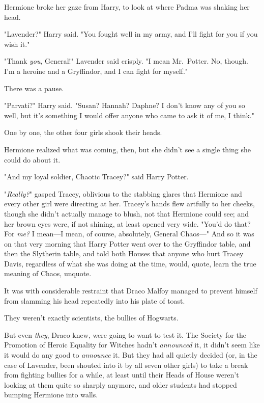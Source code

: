 Hermione broke her gaze from Harry, to look at where Padma was shaking her head.

"Lavender?" Harry said. "You fought well in my army, and I'll fight for you if
you wish it."

"Thank \emph{you}, General!" Lavender said crisply. "I mean Mr.~Potter. No,
though. I'm a heroine and a Gryffindor, and I can fight for myself."

There was a pause.

"Parvati?" Harry said. "Susan? Hannah? Daphne? I don't know any of you so well,
but it's something I would offer anyone who came to ask it of me, I think."

One by one, the other four girls shook their heads.

Hermione realized what was coming, then, but she didn't see a single thing she
could do about it.

"And my loyal soldier, Chaotic Tracey?" said Harry Potter.

"\emph{Really?}" gasped Tracey, oblivious to the stabbing glares that Hermione
and every other girl were directing at her. Tracey's hands flew artfully to her
cheeks, though she didn't actually manage to blush, not that Hermione could
see; and her brown eyes were, if not shining, at least opened very wide. "You'd
do that? For \emph{me?} I mean—I mean, of course, absolutely, General
Chaos—"
\sbreak
And so it was on that very morning that Harry Potter went over to the
Gryffindor table, and then the Slytherin table, and told both Houses that
anyone who hurt Tracey Davis, regardless of what she was doing at the time,
would, quote, learn the true meaning of Chaos, unquote.

It was with considerable restraint that Draco Malfoy managed to prevent himself
from slamming his head repeatedly into his plate of toast.

They weren't exactly scientists, the bullies of Hogwarts.

But even \emph{they}, Draco knew, were going to want to test it.
\sbreak
The Society for the Promotion of Heroic Equality for Witches hadn't
\emph{announced} it, it didn't seem like it would do any good to
\emph{announce} it. But they had all quietly decided (or, in the case of
Lavender, been shouted into it by all seven other girls) to take a break from
fighting bullies for a while, at least until their Heads of House weren't
looking at them quite so sharply anymore, and older students had stopped
bumping Hermione into walls.

